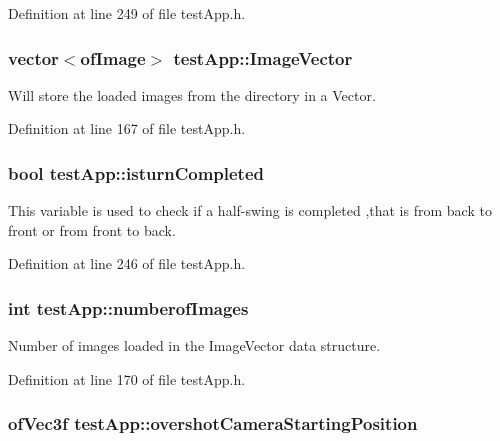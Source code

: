 Definition at line 249 of file test\-App.\-h.

\hypertarget{classtest_app_ad4de5d6e6e8f3b8bb7424e62792deb1f}{
\subsubsection[{Image\-Vector}]{\setlength{\rightskip}{0pt plus 5cm}vector$<$of\-Image$>$ test\-App\-::\-Image\-Vector}}\label{classtest_app_ad4de5d6e6e8f3b8bb7424e62792deb1f}


Will store the loaded images from the directory in a Vector. 



Definition at line 167 of file test\-App.\-h.

\hypertarget{classtest_app_a42478a80a90ce9f663c04bcdaea5c5bd}{
\subsubsection[{isturn\-Completed}]{\setlength{\rightskip}{0pt plus 5cm}bool test\-App\-::isturn\-Completed}}\label{classtest_app_a42478a80a90ce9f663c04bcdaea5c5bd}


This variable is used to check if a half-\/swing is completed ,that is from back to front or from front to back. 



Definition at line 246 of file test\-App.\-h.

\hypertarget{classtest_app_a957cf7fdb3ea964a88ca1be13e4d68fc}{
\subsubsection[{numberof\-Images}]{\setlength{\rightskip}{0pt plus 5cm}int test\-App\-::numberof\-Images}}\label{classtest_app_a957cf7fdb3ea964a88ca1be13e4d68fc}


Number of images loaded in the Image\-Vector data structure. 



Definition at line 170 of file test\-App.\-h.

\hypertarget{classtest_app_a846feea7c2c4d4b1929bb72c546b3e19}{
\subsubsection[{overshot\-Camera\-Starting\-Position}]{\setlength{\rightskip}{0pt plus 5cm}of\-Vec3f test\-App\-::overshot\-Camera\-Starting\-Position}}\label{classtest_app_a846feea7c2c4d4b1929bb72c546b3e19}


